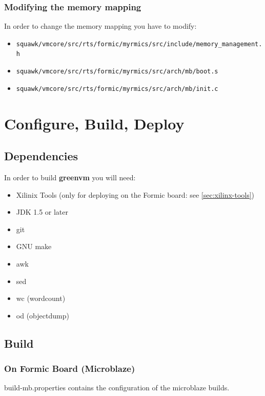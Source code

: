 \documentclass[
a4paper,
12pt,
]{report}
\newcommand{\gvm}{{\fontfamily{fco}\selectfont\textbf{\color{g}green\color{v}vm}}\xspace}
\begin{document}
\subsection{Modifying the memory mapping}

In order to change the memory mapping you have to modify:

\begin{itemize}
\item \texttt{squawk/vmcore/src/rts/formic/myrmics/src/include/memory\_management.h}
\item \texttt{squawk/vmcore/src/rts/formic/myrmics/src/arch/mb/boot.s}
\item \texttt{squawk/vmcore/src/rts/formic/myrmics/src/arch/mb/init.c}
\end{itemize}

\chapter{Configure, Build, Deploy}

\section{Dependencies}

In order to build \gvm you will need:

\begin{itemize}
\item Xilinix Tools (only for deploying on the Formic board: see
  \autoref{sec:xilinx-tools})
\item JDK 1.5 or later
\item git
\item GNU make
\item awk
\item sed
\item wc (wordcount)
\item od (objectdump)
\end{itemize}

\section{Build}
\label{sec:build}

\subsection{On Formic Board (Microblaze)}
build-mb.properties contains the configuration of the microblaze
builds.
\end{document}
